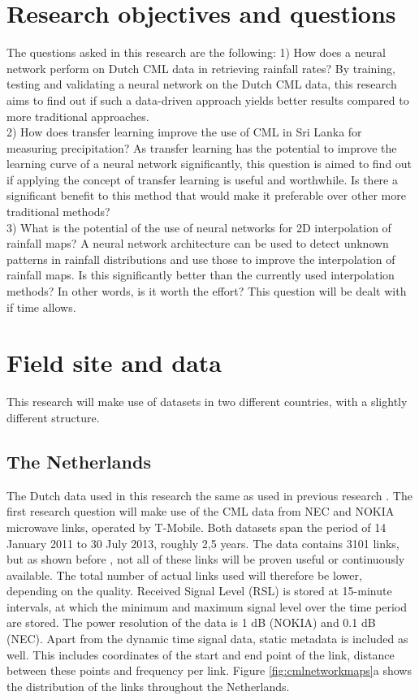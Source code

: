\documentclass[twocolumn, 10pt, a4paper]{article}
\begin{document}
	
	\section{Research objectives and questions}
	
	The questions asked in this research are the following:
	1) How does a neural network perform on Dutch CML data in retrieving rainfall rates? By training, testing and validating a neural network on the Dutch CML data, this research aims to find out if such a data-driven approach yields better results compared to more traditional approaches.\\
	2) How does transfer learning improve the use of CML in Sri Lanka for measuring precipitation? As transfer learning has the potential to improve the learning curve of a neural network significantly, this question is aimed to find out if applying the concept of transfer learning is useful and worthwhile. Is there a significant benefit to this method that would make it preferable over other more traditional methods?\\
	3) What is the potential of the use of neural networks for 2D interpolation of rainfall maps? A neural network architecture can be used to detect unknown patterns in rainfall distributions and use those to improve the interpolation of rainfall maps. Is this significantly better than the currently used interpolation methods? In other words, is it worth the effort? This question will be dealt with if time allows.\\
		
	\section{Field site and data}
	This research will make use of datasets in two different countries, with a slightly different structure.
	\subsection{The Netherlands}
	The Dutch data used in this research the same as used in previous research .
	The first research question will make use of the CML data from NEC and NOKIA microwave links, operated by T-Mobile. Both datasets span the period of 14 January 2011 to 30 July 2013, roughly 2,5 years. The data contains 3101 links, but as shown before , not all of these links will be proven useful or continuously available. The total number of actual links used will therefore be lower, depending on the quality. Received Signal Level (RSL)  is stored at 15-minute intervals, at which the minimum and maximum signal level over the time period are stored. The power resolution of the data is 1 dB (NOKIA) and 0.1 dB (NEC). 
	Apart from the dynamic time signal data, static metadata is included as well. This includes coordinates of the start and end point of the link, distance between these points and frequency per link. Figure \ref{fig:cmlnetworkmaps}a shows the distribution of the links throughout the Netherlands.
	
\end{document}
